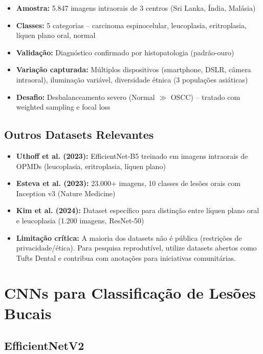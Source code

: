 \begin{itemize}
  \item \textbf{Amostra:} 5.847 imagens intraorais de 3 centros (Sri Lanka, Índia, Malásia)
  \item \textbf{Classes:} 5 categorias -- carcinoma espinocelular, leucoplasia,
        eritroplasia, líquen plano oral, normal
  \item \textbf{Validação:} Diagnóstico confirmado por histopatologia (padrão-ouro)
  \item \textbf{Variação capturada:} Múltiplos dispositivos (smartphone, DSLR,
        câmera intraoral), iluminação variável, diversidade étnica (3 populações asiáticas)
  \item \textbf{Desafio:} Desbalanceamento severo (Normal $\gg$ OSCC) --
        tratado com weighted sampling e focal loss
\end{itemize}

\subsection{Outros Datasets Relevantes}

\begin{itemize}
  \item \textbf{Uthoff et al. (2023):} EfficientNet-B5 treinado em imagens
        intraorais de OPMDs (leucoplasia, eritroplasia, líquen plano)
  \item \textbf{Esteva et al. (2023):} 23.000+ imagens, 10 classes de lesões
        orais com Inception v3 (Nature Medicine)
  \item \textbf{Kim et al. (2024):} Dataset específico para distinção entre
        líquen plano oral e leucoplasia (1.200 imagens, ResNet-50)
  \item \textbf{Limitação crítica:} A maioria dos datasets não é pública
        (restrições de privacidade/ética). Para pesquisa reprodutível, utilize
        datasets abertos como Tufts Dental e contribua com anotações para
        iniciativas comunitárias.
\end{itemize}

\section{CNNs para Classificação de Lesões Bucais}
\label{sec:cnns-lesoes}

\subsection{EfficientNetV2}

